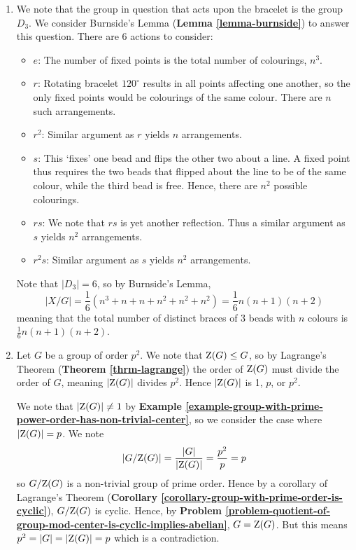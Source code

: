 \begin{enumerate}
    \item We note that the group in question that acts upon the bracelet is the group $D_3$. We consider Burnside's Lemma (\textbf{Lemma \ref{lemma-burnside}}) to answer this question. There are 6 actions to consider:
    \begin{itemize}
        \item $\boxed{e}$: The number of fixed points is the total number of colourings, $n^3$.
        \item $\boxed{r}$: Rotating bracelet $120^\circ$ results in all points affecting one another, so the only fixed points would be colourings of the same colour. There are $n$ such arrangements.
        \item $\boxed{r^2}$: Similar argument as $r$ yields $n$ arrangements.
        \item $\boxed{s}$: This `fixes' one bead and flips the other two about a line. A fixed point thus requires the two beads that flipped about the line to be of the same colour, while the third bead is free. Hence, there are $n^2$ possible colourings.
        \item $\boxed{rs}$: We note that $rs$ is yet another reflection. Thus a similar argument as $s$ yields $n^2$ arrangements.
        \item $\boxed{r^2s}$: Similar argument as $s$ yields $n^2$ arrangements.
    \end{itemize}
    Note that $|D_3| = 6$, so by Burnside's Lemma,
    \[
        |X/G| = \frac16\left(n^3 + n + n + n^2 + n^2 + n^2\right) = \frac16 n(n+1)(n+2)
    \]
    meaning that the total number of distinct braces of 3 beads with $n$ colours is $\frac16 n(n+1)(n+2)$.

    \item Let $G$ be a group of order $p^2$. We note that $\mathrm{Z}(G) \leq G$, so by Lagrange's Theorem (\textbf{Theorem \ref{thrm-lagrange}}) the order of $\mathrm{Z}(G)$ must divide the order of $G$, meaning $|\mathrm{Z}(G)|$ divides $p^2$. Hence $|\mathrm{Z}(G)|$ is 1, $p$, or $p^2$.

    We note that $|\mathrm{Z}(G)| \neq 1$ by \textbf{Example \ref{example-group-with-prime-power-order-has-non-trivial-center}}, so we consider the case where $|\mathrm{Z}(G)| = p$. We note
    \[
        |G/\mathrm{Z}(G)| = \frac{|G|}{|\mathrm{Z}(G)|} = \frac{p^2}{p} = p
    \]
    so $G/\mathrm{Z}(G)$ is a non-trivial group of prime order. Hence by a corollary of Lagrange's Theorem (\textbf{Corollary \ref{corollary-group-with-prime-order-is-cyclic}}), $G/\mathrm{Z}(G)$ is cyclic. Hence, by \textbf{Problem \ref{problem-quotient-of-group-mod-center-is-cyclic-implies-abelian}}, $G = \mathrm{Z}(G)$. But this means $p^2 = |G| = |\mathrm{Z}(G)| = p$ which is a contradiction.


\end{enumerate}
